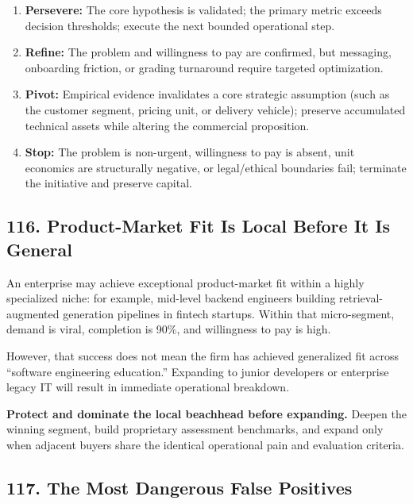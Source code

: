 \begin{enumerate}
    \item \textbf{Persevere:} The core hypothesis is validated; the primary metric exceeds decision thresholds; execute the next bounded operational step.
    \item \textbf{Refine:} The problem and willingness to pay are confirmed, but messaging, onboarding friction, or grading turnaround require targeted optimization.
    \item \textbf{Pivot:} Empirical evidence invalidates a core strategic assumption (such as the customer segment, pricing unit, or delivery vehicle); preserve accumulated technical assets while altering the commercial proposition.
    \item \textbf{Stop:} The problem is non-urgent, willingness to pay is absent, unit economics are structurally negative, or legal/ethical boundaries fail; terminate the initiative and preserve capital.
\end{enumerate}

\subsection*{116. Product-Market Fit Is Local Before It Is General}

An enterprise may achieve exceptional product-market fit within a highly specialized niche: for example, mid-level backend engineers building retrieval-augmented generation pipelines in fintech startups. Within that micro-segment, demand is viral, completion is 90\%, and willingness to pay is high.

However, that success does not mean the firm has achieved generalized fit across ``software engineering education.'' Expanding to junior developers or enterprise legacy IT will result in immediate operational breakdown.

\textbf{Protect and dominate the local beachhead before expanding.} Deepen the winning segment, build proprietary assessment benchmarks, and expand only when adjacent buyers share the identical operational pain and evaluation criteria.

\subsection*{117. The Most Dangerous False Positives}

